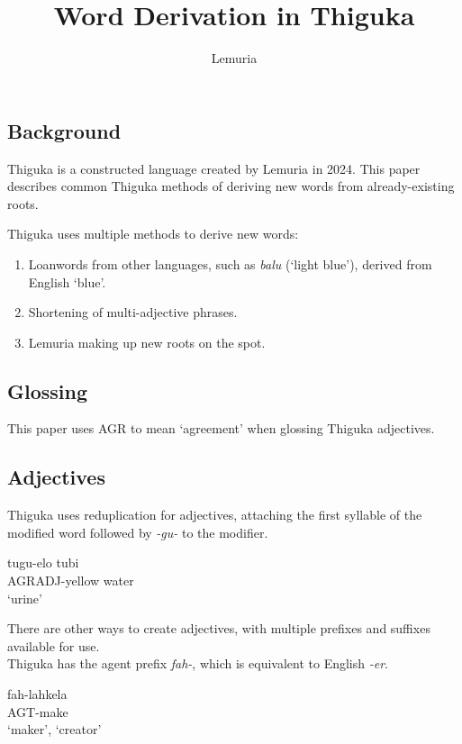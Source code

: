 \documentclass{article}
\title{Word Derivation in Thiguka}
\author{Lemuria}
\newcommand{\textapprox}{\raisebox{0.5ex}{\texttildelow}}
\newcommand{\agradj}{AGR\textapprox{}ADJ}
\begin{document}
\maketitle

\begin{multicols}{2}
\section{Background}
Thiguka is a constructed language created by Lemuria in 2024.
This paper describes common Thiguka methods of deriving new words from already-existing roots.

Thiguka uses multiple methods to derive new words:

\begin{enumerate}
    \item Loanwords from other languages, such as \emph{balu} (`light blue'), derived from English `blue'.
    \item Shortening of multi-adjective phrases.
    \item Lemuria making up new roots on the spot.
\end{enumerate}

\subsection{Glossing}
This paper uses AGR to mean `agreement' when glossing Thiguka adjectives.


\subsection{Adjectives}
Thiguka uses reduplication for adjectives, attaching the first syllable of the modified word followed by \emph{-gu-} to the modifier.

\begin{exe}
    \ex \gll tu\textapprox{}gu-elo tubi\\
             \agradj{}-yellow water\\
        \glt `urine'
\end{exe}

There are other ways to create adjectives, with multiple prefixes and suffixes available for use.\\

Thiguka has the agent prefix \emph{fah-}, which is equivalent to English \emph{-er}.\\
\begin{exe}
    \ex \gll fah-lahkela\\
    AGT-make\\
    \glt `maker', `creator'
\end{exe}


\end{multicols}
\end{document}
